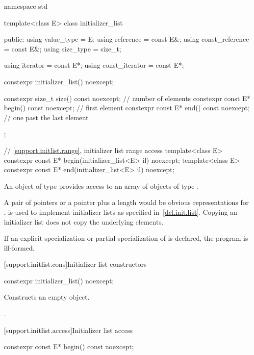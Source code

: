 \begin{codeblock}
namespace std {
  template<class E> class initializer_list {
  public:
    using value_type      = E;
    using reference       = const E&;
    using const_reference = const E&;
    using size_type       = size_t;

    using iterator        = const E*;
    using const_iterator  = const E*;

    constexpr initializer_list() noexcept;

    constexpr size_t size() const noexcept;     // number of elements
    constexpr const E* begin() const noexcept;  // first element
    constexpr const E* end() const noexcept;    // one past the last element
  };

  // \ref{support.initlist.range}, initializer list range access
  template<class E> constexpr const E* begin(initializer_list<E> il) noexcept;
  template<class E> constexpr const E* end(initializer_list<E> il) noexcept;
}
\end{codeblock}

\pnum
An object of type  provides access to an array of
objects of type . \begin{note} A pair of pointers or a pointer plus
a length would be obvious representations for .
 is used to implement initializer lists as specified
in~\ref{dcl.init.list}. Copying an initializer list does not copy the underlying
elements. \end{note}

\pnum
If an explicit specialization or partial specialization of
 is declared, the program is ill-formed.

[support.initlist.cons]{Initializer list constructors}

%
\begin{itemdecl}
constexpr initializer_list() noexcept;
\end{itemdecl}

\begin{itemdescr}
\pnum
\effects Constructs an empty  object.

\pnum
\ensures {}.
\end{itemdescr}

[support.initlist.access]{Initializer list access}

%
\begin{itemdecl}
constexpr const E* begin() const noexcept;
\end{itemdecl}

